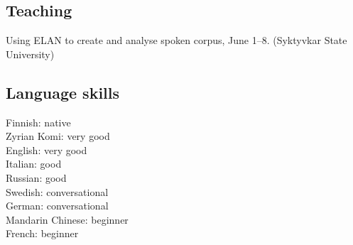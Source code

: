 \documentclass[11pt, a4paper]{article}
\newcommand{\years}[1]{\marginnote{\scriptsize #1}} %
\begin{document}








\subsection*{Teaching}

\years{2017} Using ELAN to create and analyse spoken corpus, June 1--8. (Syktyvkar State University)


\subsection*{Language skills}

Finnish: native\\
Zyrian Komi: very good\\
English: very good\\
Italian: good\\
Russian: good\\
Swedish: conversational\\
German: conversational\\
Mandarin Chinese: beginner\\
French: beginner\\
\end{document}
